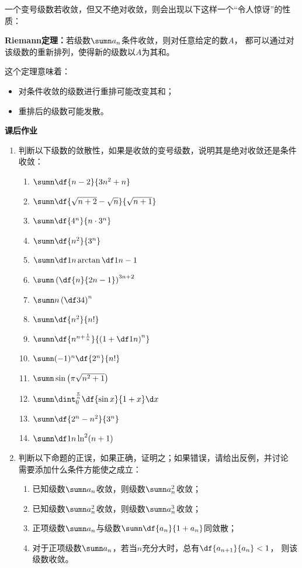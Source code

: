 \begin{shaded}
一个变号级数若收敛，但又不绝对收敛，则会出现以下这样一个“令人惊讶”的性质：

\begin{tcolorbox}
	{\bf Riemann定理：}若级数$\sumn a_n$条件收敛，则对任意给定的数$A$，
	都可以通过对该级数的重新排列，使得新的级数以$A$为其和。
\end{tcolorbox}
这个定理意味着：
\begin{itemize}
  \item 对条件收敛的级数进行重排可能改变其和；
  \item 重排后的级数可能发散。
\end{itemize}

\end{shaded}

\begin{ext}
	{\bf 课后作业}
	\begin{enumerate}
	  \item 判断以下级数的敛散性，如果是收敛的变号级数，说明其是绝对收敛还是条件收敛：
	  \begin{enumerate}[(1)]
	    \item $\sumn\df{n-2}{3n^2+n}$
	    \item $\sumn\df{\sqrt{n+2}-\sqrt{n}}{\sqrt{n+1}}$
	    \item $\sumn\df{4^n}{n\cdot 3^n}$
	    \item $\sumn\df{n^2}{3^n}$
	    \item $\sumn\df1n\arctan\df1{n-1}$
	    \item $\sumn\left(\df{n}{2n-1}\right)^{3n+2}$
	    \item $\sumn n\left(\df34\right)^n$
	    \item $\sumn\df{n^2}{n!}$
	    \item $\sumn\df{n^{n+\frac1n}}{\left(1+\df1n\right)^n}$
	    \item $\sumn(-1)^n\df{2^n}{n!}$
	    \item $\sumn\sin\left(\pi\sqrt{n^2+1}\right)$
	    \item $\sumn\dint_0^{\frac{\pi}n}\df{\sin x}{1+x}\d x$
	    \item $\sumn\df{2^n-n^2}{3^n}$
	    \item $\sumn\df1{n\ln^2(n+1)}$
	  \end{enumerate}
	  \item 判断以下命题的正误，如果正确，证明之；如果错误，请给出反例，并讨论
	  需要添加什么条件方能使之成立：
	  \begin{enumerate}[(1)]
	    \item 已知级数$\sumn a_n$收敛，则级数$\sumn a^2_n$收敛；
	    \item 已知级数$\sumn a^2_n$收敛，则级数$\sumn a^3_n$收敛；
	    \item 正项级数$\sumn a_n$与级数$\sumn\df{a_n}{1+a_n}$同敛散；
	    \item 对于正项级数$\sumn a_n$，若当$n$充分大时，总有$\df{a_{n+1}}{a_n}<1$，
	    则该级数收敛。
	  \end{enumerate}
	\end{enumerate}
\end{ext}

